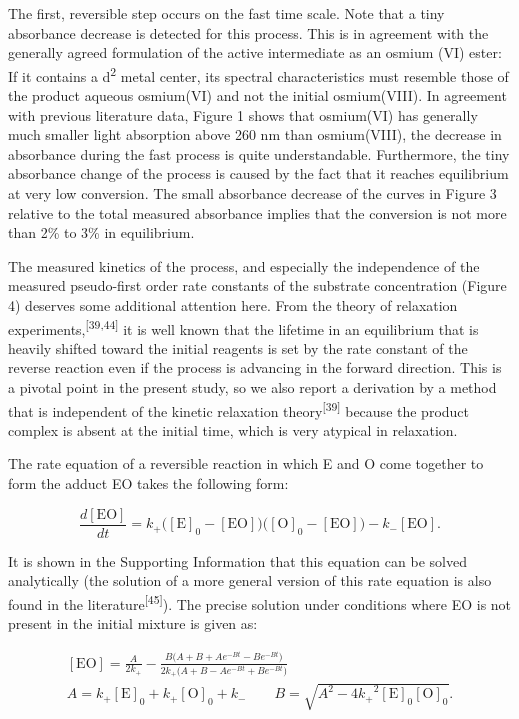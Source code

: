\documentclass{article}
\begin{document}
The first, reversible step occurs on the fast time scale. Note that a tiny absorbance decrease is detected for this process. This is in agreement with the generally agreed formulation of the active intermediate as an osmium (VI) ester: If it contains a d\textsuperscript{2} metal center, its spectral characteristics must resemble those of the product aqueous osmium(VI) and not the initial osmium(VIII). In agreement with previous literature data, Figure 1 shows that osmium(VI) has generally much smaller light absorption above 260 nm than osmium(VIII), the decrease in absorbance during the fast process is quite understandable. Furthermore, the tiny absorbance change of the process is caused by the fact that it reaches equilibrium at very low conversion. The small absorbance decrease of the curves in Figure 3 relative to the total measured absorbance implies that the conversion is not more than 2\% to 3\% in equilibrium.

The measured kinetics of the process, and especially the independence of the measured pseudo-first order rate constants of the substrate concentration (Figure 4) deserves some additional attention here. From the theory of relaxation experiments,\textsuperscript{[39,44]} it is well known that the lifetime in an equilibrium that is heavily shifted toward the initial reagents is set by the rate constant of the reverse reaction even if the process is advancing in the forward direction. This is a pivotal point in the present study, so we also report a derivation by a method that is independent of the kinetic relaxation theory\textsuperscript{[39]} because the product complex is absent at the initial time, which is very atypical in relaxation.

The rate equation of a reversible reaction in which E and O come together to form the adduct EO takes the following form:

\begin{equation}
\frac{d[\mathrm{EO}]}{dt} = k_+\bigl([\mathrm{E}]_0 - [\mathrm{EO}]\bigr)\bigl([\mathrm{O}]_0 - [\mathrm{EO}]\bigr) - k_-[\mathrm{EO}]. \tag{11}
\end{equation}

It is shown in the Supporting Information that this equation can be solved analytically (the solution of a more general version of this rate equation is also found in the literature\textsuperscript{[45]}). The precise solution under conditions where EO is not present in the initial mixture is given as:

\begin{equation}
\begin{gathered}
[\mathrm{EO}] = \frac{A}{2k_+} - \frac{B\bigl(A + B + Ae^{-Bt} - Be^{-Bt}\bigr)}{2k_+\bigl(A + B - Ae^{-Bt} + Be^{-Bt}\bigr)}\\
A = k_+[\mathrm{E}]_0 + k_+[\mathrm{O}]_0 + k_- \qquad B = \sqrt{A^2 - 4{k_+}^2[\mathrm{E}]_0[\mathrm{O}]_0}.
\end{gathered} \tag{12}
\end{equation}
\end{document}
